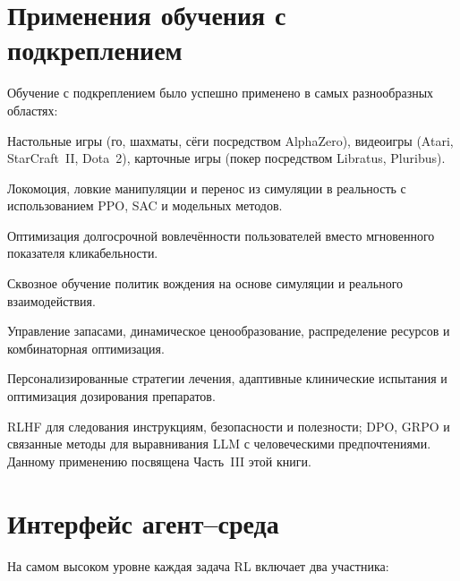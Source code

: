 \section{Применения обучения с подкреплением}
\label{sec:applications}

Обучение с подкреплением было успешно применено в самых разнообразных областях:

\begin{description}[leftmargin=!,labelwidth=3.5cm]
\item[Игры]
Настольные игры (го, шахматы, сёги посредством AlphaZero), видеоигры (Atari, StarCraft~II, Dota~2), карточные игры (покер посредством Libratus, Pluribus).

\item[Робототехника]
Локомоция, ловкие манипуляции и перенос из симуляции в реальность с использованием PPO, SAC и модельных методов.

\item[Рекомендательные системы]
Оптимизация долгосрочной вовлечённости пользователей вместо мгновенного показателя кликабельности.

\item[Автономное вождение]
Сквозное обучение политик вождения на основе симуляции и реального взаимодействия.

\item[Исследование операций]
Управление запасами, динамическое ценообразование, распределение ресурсов и комбинаторная оптимизация.

\item[Здравоохранение]
Персонализированные стратегии лечения, адаптивные клинические испытания и оптимизация дозирования препаратов.

\item[Выравнивание языковых моделей]
RLHF для следования инструкциям, безопасности и полезности; DPO, GRPO и связанные методы для выравнивания LLM с человеческими предпочтениями.  Данному применению посвящена Часть~III этой книги.
\end{description}


\section{Интерфейс агент--среда}
\label{sec:agent-env}

На самом высоком уровне каждая задача RL включает два участника:

